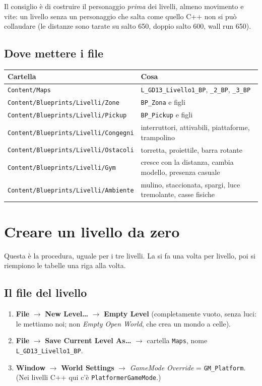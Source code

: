 \documentclass[a4paper,10pt]{article}
\newcommand{\nodo}[1]{\textsf{\textbf{#1}}}
\newcommand{\var}[1]{\texttt{#1}}
\begin{document}
Il consiglio è di costruire il personaggio \emph{prima} dei livelli, almeno movimento e vite: un livello senza un personaggio che salta come quello C++ non si può collaudare (le distanze sono tarate su salto 650, doppio salto 600, wall run 650).

\subsection{Dove mettere i file}

\begin{center}
\begin{tabular}{ll}
\toprule
Cartella & Cosa \\
\midrule
\texttt{Content/Maps} & \var{L\_GD13\_Livello1\_BP}, \var{\_2\_BP}, \var{\_3\_BP} \\
\texttt{Content/Blueprints/Livelli/Zone} & \var{BP\_Zona} e figli \\
\texttt{Content/Blueprints/Livelli/Pickup} & \var{BP\_Pickup} e figli \\
\texttt{Content/Blueprints/Livelli/Congegni} & interruttori, attivabili, piattaforme, trampolino \\
\texttt{Content/Blueprints/Livelli/Ostacoli} & torretta, proiettile, barra rotante \\
\texttt{Content/Blueprints/Livelli/Gym} & cresce con la distanza, cambia modello, presenza casuale \\
\texttt{Content/Blueprints/Livelli/Ambiente} & mulino, staccionata, spargi, luce tremolante, casse fisiche \\
\bottomrule
\end{tabular}
\end{center}

\section{Creare un livello da zero}

Questa è la procedura, uguale per i tre livelli. La si fa una volta per livello, poi si riempiono le tabelle una riga alla volta.

\subsection{Il file del livello}
\begin{enumerate}
  \item \nodo{File} $\rightarrow$ \nodo{New Level\dots} $\rightarrow$ \nodo{Empty Level} (completamente vuoto, senza luci: le mettiamo noi; non \emph{Empty Open World}, che crea un mondo a celle).
  \item \nodo{File} $\rightarrow$ \nodo{Save Current Level As\dots} $\rightarrow$ cartella \texttt{Maps}, nome \var{L\_GD13\_Livello1\_BP}.
  \item \nodo{Window} $\rightarrow$ \nodo{World Settings} $\rightarrow$ \emph{GameMode Override} = \var{GM\_Platform}. (Nei livelli C++ qui c'è \var{PlatformerGameMode}.)
\end{enumerate}
\end{document}
